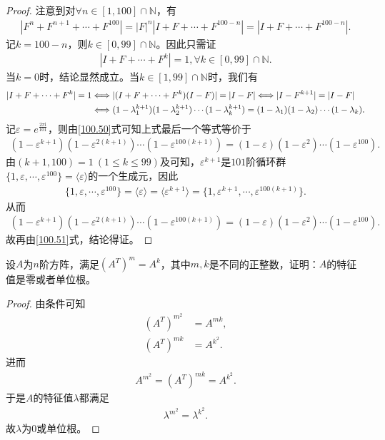 \documentclass[../../main.tex]{subfiles}
\begin{document}
\begin{proof}
注意到对$\forall n\in [1,100]\cap \mathbb{N}$，有
\begin{align*}
|F^n + F^{n + 1} + \cdots + F^{100}| = |F|^n|I + F + \cdots + F^{100 - n}| = |I + F + \cdots + F^{100 - n}|.
\end{align*}
记$k = 100 - n$，则$k\in [0,99]\cap \mathbb{N}$。因此只需证
\begin{align*}
|I + F + \cdots + F^k| = 1,\forall k\in [0,99]\cap \mathbb{N}.
\end{align*}
当$k = 0$时，结论显然成立。当$k\in [1,99]\cap \mathbb{N}$时，我们有
\begin{align}
|I + F + \cdots + F^k| = 1 &\Longleftrightarrow |(I + F + \cdots + F^k)(I - F)| = |I - F| \Longleftrightarrow |I - F^{k + 1}| = |I - F| \notag \\
&\Longleftrightarrow (1 - \lambda_1^{k + 1})(1 - \lambda_2^{k + 1})\cdots (1 - \lambda_k^{k + 1}) = (1 - \lambda_1)(1 - \lambda_2)\cdots (1 - \lambda_k). \label{100.51}
\end{align}
记$\varepsilon = e^{\frac{2\pi \mathrm{i}}{101}}$，则由\eqref{100.50}式可知上式最后一个等式等价于
\begin{align*}
(1 - \varepsilon^{k + 1})(1 - \varepsilon^{2(k + 1)})\cdots (1 - \varepsilon^{100(k + 1)}) = (1 - \varepsilon)(1 - \varepsilon^2)\cdots (1 - \varepsilon^{100}).
\end{align*}
由$(k + 1,100) = 1\ (1\leqslant k\leqslant 99)$及可知，$\varepsilon^{k + 1}$是$101$阶循环群$\{1,\varepsilon,\cdots,\varepsilon^{100}\} = \langle \varepsilon \rangle$的一个生成元，因此
\begin{align*}
\{1,\varepsilon,\cdots,\varepsilon^{100}\} = \langle \varepsilon \rangle = \langle \varepsilon^{k + 1} \rangle = \{1,\varepsilon^{k + 1},\cdots,\varepsilon^{100(k + 1)}\}.
\end{align*}
从而
\begin{align*}
(1 - \varepsilon^{k + 1})(1 - \varepsilon^{2(k + 1)})\cdots (1 - \varepsilon^{100(k + 1)}) = (1 - \varepsilon)(1 - \varepsilon^2)\cdots (1 - \varepsilon^{100}).
\end{align*}
故再由\eqref{100.51}式，结论得证。 

\end{proof}

\begin{example}
设$A$为$n$阶方阵，满足$(A^T)^m = A^k$，其中$m,k$是不同的正整数，证明：$A$的特征值是零或者单位根。 
\end{example}
\begin{proof}
由条件可知
\begin{align*}
(A^T)^{m^2}&=A^{mk},\\
(A^T)^{mk}&=A^{k^2}.
\end{align*}
进而
\begin{align*}
A^{m^2}=(A^T)^{mk}=A^{k^2}.
\end{align*}
于是$A$的特征值$\lambda$都满足
\begin{align*}
\lambda^{m^2}=\lambda^{k^2}.
\end{align*}
故$\lambda$为$0$或单位根。 

\end{proof}
\end{document}
